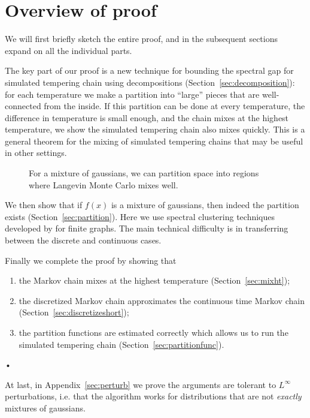 \section{Overview of proof}

We will first briefly sketch the entire proof, and in the subsequent sections expand on all the individual parts. 

The key part of our proof is a new technique for bounding the spectral gap for simulated tempering chain using decompositions (Section~\ref{sec:decomposition}): for each temperature 
we make a partition 
into ``large'' pieces that are well-connected from the inside. If this partition can be done at every temperature, the difference in temperature is small enough, and the chain mixes at the highest temperature, we show the simulated tempering chain also mixes quickly. This is a general theorem for the mixing of simulated tempering chains that may be useful in other settings. %

\begin{figure}[h!]
\centering
{}
\caption{For a mixture of gaussians, we can partition space into regions where Langevin Monte Carlo mixes well.}
\label{fig:partition}
\end{figure}

We then show that if $f(x)$ is a mixture of gaussians, then indeed the partition exists (Section~\ref{sec:partition}). Here we use spectral clustering techniques developed by \cite{gharan2014partitioning} for finite graphs. The main technical difficulty is in transferring between the discrete and continuous cases.

Finally we complete the proof by showing that
\begin{enumerate}
\item
the Markov chain mixes at the highest temperature (Section~\ref{sec:mixht});
\item
the discretized Markov chain approximates the continuous time Markov chain (Section~\ref{sec:discretizeshort});
\item
the partition functions are estimated correctly which allows us to run the simulated tempering chain (Section~\ref{sec:partitionfunc}).
\end{enumerate}•

At last, in Appendix~\ref{sec:perturb} we prove the arguments are tolerant to $L^{\infty}$ perturbations, i.e. that the algorithm works for distributions that are not \emph{exactly} mixtures of gaussians.   

